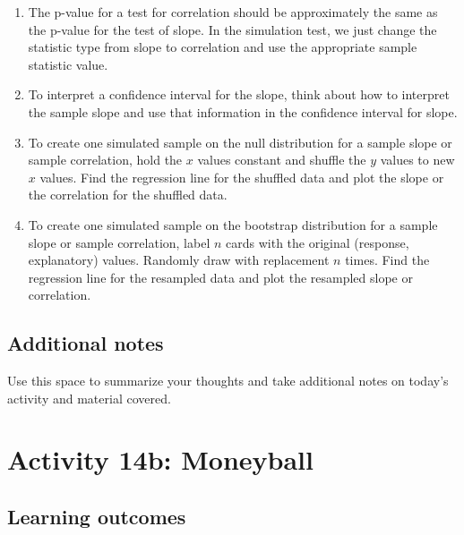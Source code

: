 \documentclass[
]{report}
\begin{document}
\begin{enumerate}
\def\labelenumi{\arabic{enumi}.}
\item
  The p-value for a test for correlation should be approximately the same as the p-value for the test of slope. In the simulation test, we just change the statistic type from slope to correlation and use the appropriate sample statistic value.
\item
  To interpret a confidence interval for the slope, think about how to interpret the sample slope and use that information in the confidence interval for slope.
\item
  To create one simulated sample on the null distribution for a sample slope or sample correlation, hold the \(x\) values constant and shuffle the \(y\) values to new \(x\) values. Find the regression line for the shuffled data and plot the slope or the correlation for the shuffled data.
\item
  To create one simulated sample on the bootstrap distribution for a sample slope or sample correlation, label \(n\) cards with the original (response, explanatory) values. Randomly draw with replacement \(n\) times. Find the regression line for the resampled data and plot the resampled slope or correlation.
\end{enumerate}

\hypertarget{additional-notes-22}{%
\subsection{Additional notes}\label{additional-notes-22}}

Use this space to summarize your thoughts and take additional notes on today's activity and material covered.

\newpage

\hypertarget{activity-14b-moneyball}{%
\section{Activity 14b: Moneyball}\label{activity-14b-moneyball}}


\hypertarget{learning-outcomes-9}{%
\subsection{Learning outcomes}\label{learning-outcomes-9}}
\end{document}

